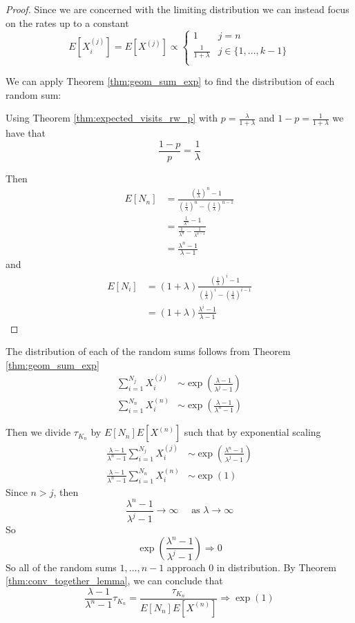 \begin{proof}
Since we are concerned with the limiting distribution we can instead focus on the rates up to a constant
$$
E[X_i^{(j)}] = E[X^{(j)}] \propto \begin{cases}
  1 & j = n\\
  \frac{1}{1 + \lambda} & j \in \{1,\ldots, k - 1\}\\
\end{cases}
$$

We can apply Theorem \ref{thm:geom_sum_exp} to find the distribution of each random sum:

Using Theorem \ref{thm:expected_visits_rw_p} with $p = \frac{\lambda}{1 + \lambda}$ and $1 - p = \frac{1}{1 + \lambda}$ we have that
$$
\frac{1 - p}{p} = \frac{1}{\lambda}
$$

Then
\begin{align*}
    E[N_n] &= \frac{
        \left( \frac{1}{\lambda} \right)^{n} - 1
    }{
        \left( \frac{1}{\lambda} \right)^{n} - \left( \frac{1}{\lambda} \right)^{n - 1}
    }\\
    &= \frac{
        \frac{1}{\lambda^n} - 1
    }{
        \frac{1}{\lambda^n} - \frac{1}{\lambda^{n - 1}}
    }\\
    &= \frac{\lambda^n - 1}{\lambda - 1}
\end{align*}
and
\begin{align*}
E[N_i] &= (1 + \lambda) \frac{
        \left( \frac{1}{\lambda} \right)^{i} - 1
    }{
        \left( \frac{1}{\lambda} \right)^{i} - \left( \frac{1}{\lambda} \right)^{i - 1}
    }\\
    &= (1 + \lambda) \frac{\lambda^i - 1}{\lambda - 1}
\end{align*}
\end{proof}

The distribution of each of the random sums follows from Theorem \ref{thm:geom_sum_exp}
\begin{align*}
\sum_{i = 1}^{N_j} X_i^{(j)} &\sim \exp\left(
    \frac{\lambda - 1}{\lambda^j - 1} \right)\\
\sum_{i = 1}^{N_n} X_i^{(n)} &\sim \exp\left(
    \frac{\lambda - 1}{\lambda^n - 1}
\right)
\end{align*}

Then we divide $\tau_{K_n}$ by
$E[N_{n}]E[X^{(n)}]$ such that by exponential scaling
\begin{align*}
\frac{\lambda - 1}{\lambda^n - 1} \sum_{i = 1}^{N_j} X_i^{(j)} &\sim \exp\left(
    \frac{\lambda^n - 1}{\lambda^j - 1} \right)\\
\frac{\lambda - 1}{\lambda^n - 1} \sum_{i = 1}^{N_n} X_i^{(n)} &\sim \exp(1)
\end{align*}
Since $n > j$, then
$$
\frac{\lambda^n - 1}{\lambda^j - 1} \to \infty \quad \text{ as } \lambda \to \infty
$$
So
$$
\exp\left(
    \frac{\lambda^n - 1}{\lambda^j - 1}
\right) \Rightarrow 0
$$
So all of the random sums $1, \ldots, n - 1$ approach 0 in distribution.
By Theorem \ref{thm:conv_together_lemma}, we can conclude that
$$
\frac{\lambda - 1}{\lambda^n - 1} \tau_{K_n} = \frac{\tau_{K_n}}{E[N_{n}]E[X^{(n)}]} \Rightarrow \exp(1)
$$

